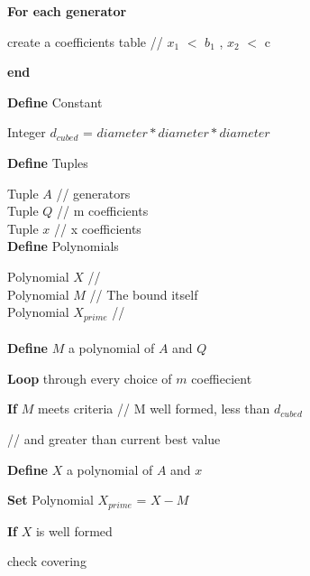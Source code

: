 \begin{centering}
\begin{block}\textbf{For each generator }  

\hspace{5mm}create a coefficients table  // $x_1$ $<$ $b_1$ , $x_2$ $<$ c 

\textbf{end}

\textbf{Define} Constant 

\hspace{5mm}Integer $d_{cubed}$ = $diameter * diameter * diameter$

\textbf{Define} Tuples

\hspace{5mm}Tuple $A$ // generators\\
\hspace{5mm}Tuple $Q$  // m coefficients\\
\hspace{5mm}Tuple $x$  // x coefficients\\

\pagebreak
\textbf{Define} Polynomials

\hspace{5mm}Polynomial $X$ // \\
\hspace{5mm}Polynomial $M$  // The bound itself\\
\hspace{5mm}Polynomial $X_{prime}$  // \\ \ \\

\textbf{Define} $M$ a polynomial of $A$ and $Q$

\textbf{Loop} through every choice of $m$ coeffiecient

\hspace{5mm}\textbf{If} $M$ meets criteria // M well formed, less than $d_{cubed}$

\hspace{38mm}// and greater than current best  value

\hspace{10mm}\textbf{Define} $X$ a polynomial of $A$ and $x$

\hspace{10mm}\textbf{Set} Polynomial $X_{prime}$ = $X-M$

\hspace{10mm}\textbf{If} $X$ is well formed

\hspace{15mm}check covering


\end{block}
\end{centering}
